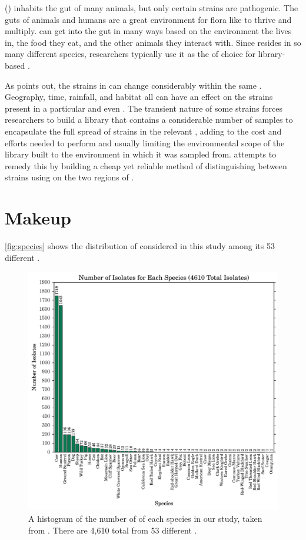 \ecolilong{} (\ecoli{}) inhabits the gut of many animals, but only certain strains are pathogenic.
The guts of animals and humans are a great environment for flora like \ecoli{} to thrive and multiply.
\ecoli{} can get into the gut in many ways based on the environment the \host{} lives in, the food they eat, and the other animals they interact with.
Since \ecoli{} resides in so many different species, researchers typically use it as the \fib{} of choice for library-based \mst{}.

As \cite{rogers2005detecting} points out, the strains in \ecoli{} can change considerably  within the same \spec{}.
Geography, time, rainfall, and habitat all can have an effect on the strains present in a particular \spec{} and even \host{}.
The transient nature of some \ecoli{} strains forces researchers to build a library that contains a considerable number of samples to encapsulate the full spread of strains in the relevant \spec{}, adding to the cost and efforts needed to perform \mst{} and usually limiting the environmental scope of the library built to the environment in which it was sampled from.
\cploplong{} attempts to remedy this by building a cheap yet reliable method of distinguishing between strains using \pyros{} on the two \itsshort{} regions of \ecoli{}.

\section{\cplop{} Makeup}
\autoref{fig:species} shows the distribution of \cplop{} \isols{} considered in this study among its 53 different \spec{}.
\begin{figure}[t]
    \centering
    \includegraphics[width=\linewidth]{figures/bs/species_hist.pdf}
    \caption{
    A histogram of the number of \isols{} of each species in our study, taken from \cplop{}.
    There are 4,610 total \isols{} from 53 different \specs{}.}
    \label{fig:species}
\end{figure}

